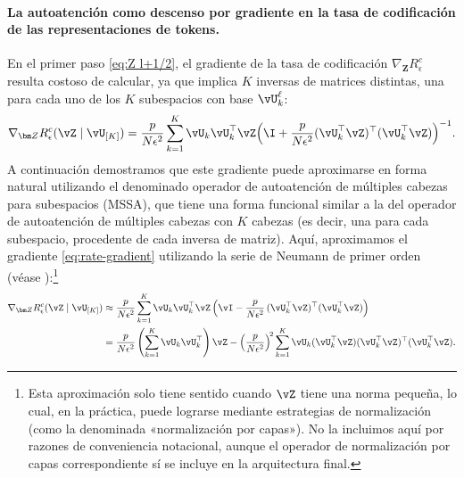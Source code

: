 \documentclass[../../book-main.tex]{subfiles}
\begin{document}
\paragraph{La autoatención como descenso por gradiente en la tasa de codificación de las representaciones 
de tokens.} En el primer paso \eqref{eq:Z l+1/2}, el gradiente
de la tasa de codificación \(\nabla_{\bm Z} R^c_\epsilon\) resulta costoso de
calcular, ya que implica \(K\) inversas de matrices distintas, una para cada
uno de los \(K\) subespacios con base \(\vU_{k}^{\ell}\):
\begin{equation}
    \nabla_{\bm Z} R_{\epsilon}^c(\vZ \mid \vU_{[K]})
    = \frac{p}{N\epsilon^2}\sum_{k=1}^K \vU_k\vU_k^\top\vZ\Big(\I +
    \frac{p}{N\epsilon^2}(\vU_k^\top\vZ)^\top(\vU_k^\top\vZ)\Big)^{-1}.
    \label{eq:rate-gradient}
\end{equation}
A continuación demostramos que este gradiente puede aproximarse en forma natural
utilizando el denominado operador de autoatención de múltiples cabezas para subespacios (MSSA),
que tiene una forma funcional similar a la del operador de autoatención de múltiples cabezas
\citep{vaswani2017attention} con \(K\) cabezas (es decir, una para
cada subespacio, procedente de cada inversa de matriz). Aquí, aproximamos 
el gradiente \eqref{eq:rate-gradient} utilizando la serie de Neumann de primer orden
(véase ):\footnote{Esta aproximación solo
    tiene sentido cuando \(\vZ\) tiene una norma pequeña, lo cual, en la práctica, puede
    lograrse mediante estrategias de normalización (como la denominada «normalización
    por capas»). No la incluimos aquí por razones de
    conveniencia notacional, aunque el operador de normalización por capas correspondiente sí
    se incluye en la arquitectura final.}
\begin{align}
\nabla_{\bm Z} R_{\epsilon}^{c}(\vZ \mid \vU_{[K]})
    &\approx \frac{p}{N\epsilon^2}
    \sum_{k = 1}^{K}
    \vU_{k}\vU_{k}^\top\vZ
    \left(\vI - \frac{p}{N\epsilon^2}\,
    (\vU_{k}^\top\vZ)^\top(\vU_{k}^\top\vZ)\right) \\
    &= \frac{p}{N\epsilon^2}
    \left(\sum_{k = 1}^{K} \vU_{k}\vU_{k}^\top\right)\vZ
    - \left(\frac{p}{N\epsilon^2}\right)^{\!2}
    \sum_{k = 1}^{K}
    \vU_{k}(\vU_{k}^\top\vZ)(\vU_{k}^\top\vZ)^\top(\vU_{k}^\top\vZ).
\end{align}
\end{document}

